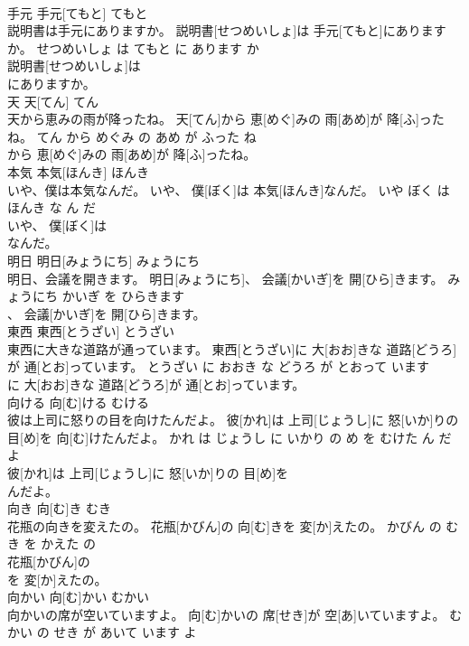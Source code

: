 \documentclass[8pt]{extreport}
\begin{document}
\begin{CJK}{UTF8}{min}
\\	手元	手元[てもと]	てもと	
\\	説明書は手元にありますか。	説明書[せつめいしょ]は 手元[てもと]にありますか。	せつめいしょ は てもと に あります か	
\\	説明書[せつめいしょ]は
\\	にありますか。			
\\	天	天[てん]	てん	
\\	天から恵みの雨が降ったね。	天[てん]から 恵[めぐ]みの 雨[あめ]が 降[ふ]ったね。	てん から めぐみ の あめ が ふった ね	
\\	から 恵[めぐ]みの 雨[あめ]が 降[ふ]ったね。			
\\	本気	本気[ほんき]	ほんき	
\\	いや、僕は本気なんだ。	いや、 僕[ぼく]は 本気[ほんき]なんだ。	いや ぼく は ほんき な ん だ	
\\	いや、 僕[ぼく]は
\\	なんだ。			
\\	明日	明日[みょうにち]	みょうにち	
\\	明日、会議を開きます。	明日[みょうにち]、 会議[かいぎ]を 開[ひら]きます。	みょうにち かいぎ を ひらきます	
\\	、 会議[かいぎ]を 開[ひら]きます。			
\\	東西	東西[とうざい]	とうざい	
\\	東西に大きな道路が通っています。	東西[とうざい]に 大[おお]きな 道路[どうろ]が 通[とお]っています。	とうざい に おおき な どうろ が とおって います	
\\	に 大[おお]きな 道路[どうろ]が 通[とお]っています。			
\\	向ける	向[む]ける	むける	
\\	彼は上司に怒りの目を向けたんだよ。	彼[かれ]は 上司[じょうし]に 怒[いか]りの 目[め]を 向[む]けたんだよ。	かれ は じょうし に いかり の め を むけた ん だ よ	
\\	彼[かれ]は 上司[じょうし]に 怒[いか]りの 目[め]を
\\	んだよ。			
\\	向き	向[む]き	むき	
\\	花瓶の向きを変えたの。	花瓶[かびん]の 向[む]きを 変[か]えたの。	かびん の むき を かえた の	
\\	花瓶[かびん]の
\\	を 変[か]えたの。			
\\	向かい	向[む]かい	むかい	
\\	向かいの席が空いていますよ。	向[む]かいの 席[せき]が 空[あ]いていますよ。	むかい の せき が あいて います よ	

\end{CJK}
\end{document}
